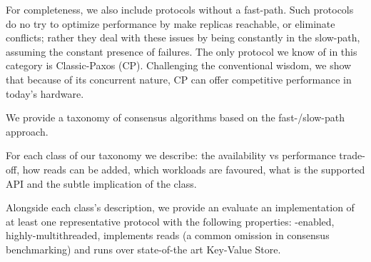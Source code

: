 \begin{comment}
The potential upside of this approach is is not only performance but also high availability. The timeouts are implemented  per-request and, more crucially, the penalty of timing-out is only a few broadcast rounds for the offending request. Therefore the timeouts can be arbitrarily small, allowing for high availability.

This class has not received substantial attention from the research community. 
We remedy this by evaluating 

\emph{All-aboard Paxos}, a newly proposed, but never-before evaluated protocol. We believe that showcasing the 
the benefits and the shortcomings of this approach, can have a profound impact in the research discussion on distributed consensus.
\end{comment}



For completeness, we also include protocols without a fast-path. Such protocols do no try to optimize performance by make replicas reachable, or eliminate conflicts; rather they deal with these issues by being constantly in the slow-path, assuming the constant presence of failures. 
The only protocol we know of in this category is Classic-Paxos (CP). 
Challenging the conventional wisdom, we show that because of its concurrent nature, CP can offer competitive performance in today's hardware. 




\squishlistContrib
\item We provide a taxonomy of consensus algorithms based on the fast-/slow-path approach.
\item For each class of our taxonomy we describe: the availability vs performance trade-off, how reads can be added, which workloads are favoured, what is the supported API and the subtle implication of the class. 
\item Alongside each class's description, we provide an evaluate an implementation of at least one representative protocol with the following properties: \RDMA-enabled, highly-multithreaded, implements reads (a common omission in consensus benchmarking) and runs over state-of-the art Key-Value Store.
\squishend
{}

